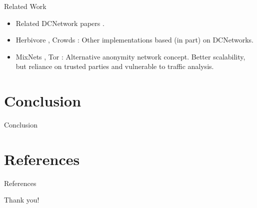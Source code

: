 \documentclass[]{beamer} %
\begin{document}
\begin{frame}{Related Work}
\begin{itemize}
\item Related \ac{DCNetwork} papers \cite{waidner1989dining,juels2004dining,bos1990detection}.
\item Herbivore \cite{goel2003herbivore}, Crowds \cite{reiter1998crowds}:
      Other implementations based (in part) on \acp{DCNetwork}.
\item \acp{MixNet} \cite{journals/cacm/Chaum81}, Tor \cite{conf/uss/DingledineMS04}:
      Alternative anonymity network concept. Better scalability,
      but reliance on trusted parties and vulnerable to traffic analysis.
\end{itemize}

\end{frame}

\section{Conclusion}

\begin{frame}{Conclusion}
\end{frame}

\section{References}

\begin{frame}[allowframebreaks]{References}
\nocite{journals/joc/Chaum88}
\nocite{von2003k}
\nocite{journals/corr/abs-1004-3057}
\nocite{corrigan2013proactively}
\printbibliography
\end{frame}


\begin{titleframe}
	\begin{center}
	\alert{\Large Thank you!}
	\end{center}
\end{titleframe}
\end{document}
